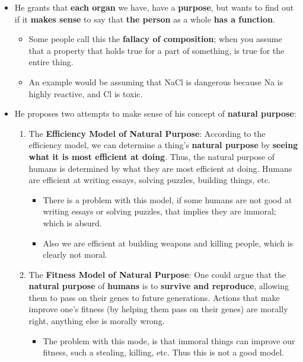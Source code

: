 \documentclass[16pt]{article}
\begin{document}
\begin{itemize}
        \item He grants that \textbf{each organ} we have, have a \textbf{purpose}, but wants to find out if it \textbf{makes sense} to say that \textbf{the person} as a whole \textbf{has a function}.
        \begin{itemize}
            \item Some people call this the \textbf{fallacy of composition}; when you assume that a property that holds true for a part of something, is true for the entire thing.
            \item An example would be assuming that NaCl is dangerous because Na is highly reactive, and Cl is toxic.
        \end{itemize}
        \item He proposes two attempts to make sense of his concept of \textbf{natural purpose}:
        \begin{enumerate}
            \item The \textbf{Efficiency Model of Natural Purpose}: According to the efficiency model, we can determine a thing's \textbf{natural purpose} by \textbf{seeing what it is most efficient at doing}. Thus, the natural purpose of humans is determined by what they are most efficient at doing. Humans are efficient at writing essays, solving puzzles, building things, etc.
            \begin{itemize}
                \item There is a problem with this model, if some humans are not good at writing essays or solving puzzles, that implies they are immoral; which is absurd.
                \item Also we are efficient at building weapons and killing people, which is clearly not moral.
            \end{itemize} 
            \item The \textbf{Fitness Model of Natural Purpose}: One could argue that the \textbf{natural purpose} of \textbf{humans} is to \textbf{survive and reproduce}, allowing them to pass on their genes to future generations. Actions that make improve one's fitness (by helping them pass on their genes) are morally right, anything else is morally wrong.
            \begin{itemize}
                \item The problem with this mode, is that immoral things can improve our fitness, such a stealing, killing, etc. Thus this is not a good model.
            \end{itemize}
        \end{enumerate}
    \end{itemize}
\end{document}
